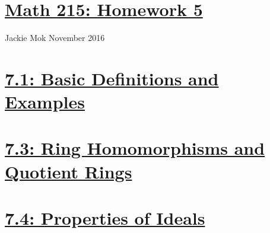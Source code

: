 \documentclass{article}
\begin{document}
\section*{\underline{Math 215: Homework 5}}
Jackie Mok
 November 2016

\section*{\underline{7.1: Basic Definitions and Examples}}


\section*{\underline{7.3: Ring Homomorphisms and Quotient Rings}}





\section*{\underline{7.4: Properties of Ideals}}



\end{document}
